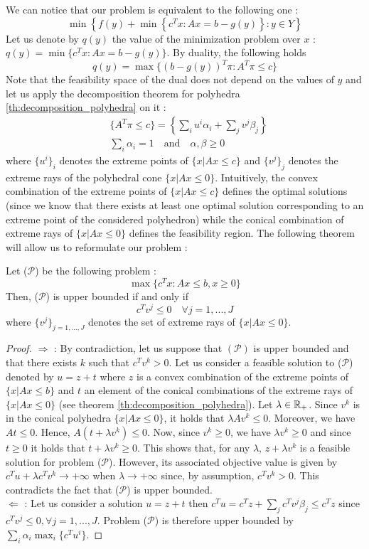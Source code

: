 We can notice that our problem is equivalent to the following one : \[
    \min\left\{ f(y) + \min\left\{ c^Tx : Ax = b - g(y) \right\} : y \in Y \right\}
\] Let us denote by $q(y)$ the value of the minimization problem over $x$ : $q(y) = \min\{ c^Tx : Ax = b - g(y) \}$. By duality, the following holds \[
    q(y) = \max\{ (b-g(y))^T\pi : A^T\pi \le c \}
\] Note that the feasibility space of the dual does not depend on the values of $y$ and let us apply the decomposition theorem for polyhedra \ref{th:decomposition_polyhedra} on it :
\begin{align*}
    &\{ A^T\pi \le c \} = \left\{ \sum_i u^i\alpha_i + \sum_j v^j\beta_j \right\} \\
    &\sum_i \alpha_i = 1 \quad\textrm{and}\quad \alpha, \beta \ge 0
\end{align*} where $\{u^i\}_i$ denotes the extreme points of $\{x|Ax\le c\}$ and $\{v^j\}_j$ denotes the extreme rays of the polyhedral cone $\{x|Ax\le 0\}$. Intuitively, the convex combination of the extreme points of $\{x|Ax\le c\}$ defines the optimal solutions (since we know that there exists at least one optimal solution corresponding to an extreme point of the considered polyhedron) while the conical combination of extreme rays of $\{x|Ax\le 0\}$ defines the feasibility region. The following theorem will allow us to reformulate our problem :
\begin{theorem}
    \label{th:upper_bounded_problem_theorem}
    Let ($\mathcal P$) be the following problem : \[ \max\{ c^Tx : Ax \le b, x\ge 0 \} \tag{$\mathcal P$} \] Then, ($\mathcal P$) is upper bounded if and only if 
    \[ c^Tv^j \le 0\quad \forall j=1,...,J \]
    where $\{v^j\}_{j=1,...,J}$ denotes the set of extreme rays of $\{x|Ax\le 0\}$. 
\end{theorem}
\begin{proof}
$\Rightarrow$ : By contradiction, let us suppose that $(\mathcal P)$ is upper bounded and that there exists $k$ such that $c^Tv^k > 0$. Let us consider a feasible solution to ($\mathcal P$) denoted by $u = z + t$ where $z$ is a convex combination of the extreme points of $\{x|Ax\le b\}$ and $t$ an element of the conical combinations of the extreme rays of $\{x|Ax\le 0\}$ (see theorem \ref{th:decomposition_polyhedra}). Let $\lambda\in\mathbb R_+$. Since $v^k$ is in the conical polyhedra $\{x|Ax\le 0\}$, it holds that $\lambda Av^k\le 0$. Moreover, we have $At\le 0$. Hence, $A(t+\lambda v^k)\le 0$. Now, since $v^k\ge 0$, we have $\lambda v^k\ge 0$ and since $t\ge 0$ it holds that $t+\lambda v^k\ge 0$. This shows that, for any $\lambda$, $z+\lambda v^k$ is a feasible solution for problem ($\mathcal P$). However, its associated objective value is given by $c^Tu + \lambda c^Tv^k\rightarrow +\infty$ when $\lambda\rightarrow+\infty$ since, by assumption, $c^Tv^k> 0$. This contradicts the fact that ($\mathcal P$) is upper bounded. \\
$\Leftarrow$ : Let us consider a solution $u = z + t$ then $c^Tu = c^Tz + \sum_j c^Tv^j\beta_j \le c^Tz$ since $c^Tv^j\le 0, \forall j=1,...,J$. Problem ($\mathcal P$) is therefore upper bounded by $\sum_i \alpha_i \max_i\{ c^Tu^i \}$. 
\end{proof}
